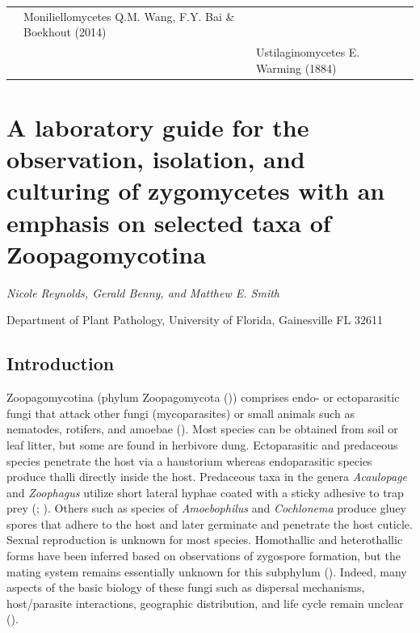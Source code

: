 \documentclass[]{book}
\begin{document}
\begin{longtable}[]{@{}lll@{}}
\begin{minipage}[t]{0.28\columnwidth}
\strut
\end{minipage} & \begin{minipage}[t]{0.31\columnwidth}\raggedright
Moniliellomycetes Q.M. Wang, F.Y. Bai \& Boekhout (2014)\strut
\end{minipage}\tabularnewline
\begin{minipage}[t]{0.32\columnwidth}\raggedright
\strut
\end{minipage} & \begin{minipage}[t]{0.28\columnwidth}\raggedright
\strut
\end{minipage} & \begin{minipage}[t]{0.31\columnwidth}\raggedright
Ustilaginomycetes E. Warming (1884)\strut
\end{minipage}\tabularnewline
\bottomrule
\end{longtable}

\hypertarget{lab_zoopago}{%
\chapter{A laboratory guide for the observation, isolation, and culturing of zygomycetes with an emphasis on selected taxa of Zoopagomycotina}\label{lab_zoopago}}

\emph{Nicole Reynolds, Gerald Benny, and Matthew E. Smith}

Department of Plant Pathology, University of Florida, Gainesville FL 32611

\hypertarget{introduction}{%
\section{Introduction}\label{introduction}}

Zoopagomycotina (phylum Zoopagomycota (\citet{Spatafora_2016})) comprises endo- or ectoparasitic fungi that attack other fungi (mycoparasites) or small animals such as nematodes, rotifers, and amoebae (\citet{Hibbett_2007}). Most species can be obtained from soil or leaf litter, but some are found in herbivore dung. Ectoparasitic and predaceous species penetrate the host via a haustorium whereas endoparasitic species produce thalli directly inside the host. Predaceous taxa in the genera \emph{Acaulopage} and \emph{Zoophagus} utilize short lateral hyphae coated with a sticky adhesive to trap prey (\citet{Drechsler_1935A}; \citet{Sommerstorff_1911}). Others such as species of \emph{Amoebophilus} and \emph{Cochlonema} produce gluey spores that adhere to the host and later germinate and penetrate the host cuticle. Sexual reproduction is unknown for most species. Homothallic and heterothallic forms have been inferred based on observations of zygospore formation, but the mating system remains essentially unknown for this subphylum (\citet{Benjamin_1979}). Indeed, many aspects of the basic biology of these fungi such as dispersal mechanisms, host/parasite interactions, geographic distribution, and life cycle remain unclear (\citet{Benny_2016}).
\end{document}
